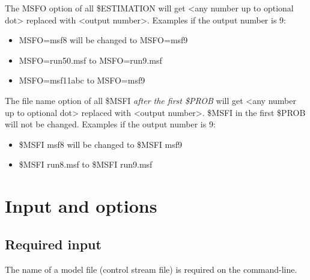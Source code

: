 \noindent The MSFO option of all \$ESTIMATION will get <any number up to optional dot> replaced with <output number>. 
Examples if the output number is 9:
\begin{itemize}
\item MSFO=msf8 will be changed to MSFO=msf9
\item MSFO=run50.msf to MSFO=run9.msf
\item MSFO=msf11abc to MSFO=msf9
\end{itemize}

\noindent The file name option of all \$MSFI \emph{after the first \$PROB} will get 
<any number up to optional dot> replaced with <output number>. \$MSFI in the first \$PROB
will not be changed.
Examples if the output number is 9:
\begin{itemize}
\item \$MSFI msf8 will be changed to \$MSFI msf9
\item \$MSFI run8.msf to \$MSFI run9.msf
\end{itemize}

\section{Input and options}

\subsection{Required input}
The name of a model file (control stream file) is required on the command-line.

